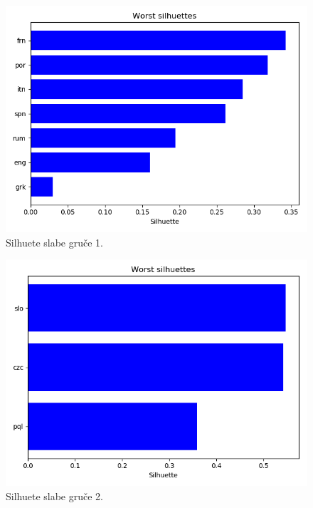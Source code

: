 \documentclass[a4paper,11pt]{article}
\begin{document}
\begin{figure}[htbp]
	\begin{center}
		\includegraphics[scale=0.5]{worst1.png}
		\caption{Silhuete slabe gruče 1.}
		\label{slika1}
	\end{center}
\end{figure}

\begin{figure}[htbp]
	\begin{center}
		\includegraphics[scale=0.5]{worst2.png}
		\caption{Silhuete slabe gruče 2.}
		\label{slika1}
	\end{center}
\end{figure}
\end{document}
